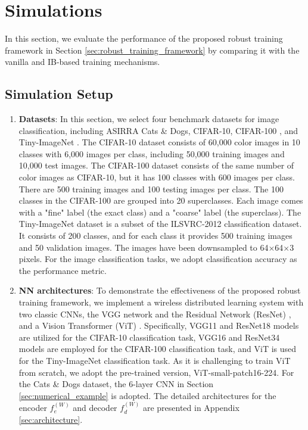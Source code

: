 \documentclass[lettersize,journal]{IEEEtran}
\theoremstyle{definition}
\theoremstyle{plain}
\begin{document}
\section{Simulations}
\label{sec:simulation}
In this section, we evaluate the performance of the proposed robust training framework in Section \ref{sec:robust_training_framework} by comparing it with the vanilla and IB-based training mechanisms.

\subsection{Simulation Setup}
\begin{enumerate}
    \item \textbf{Datasets}: In this section, we select four benchmark datasets for image classification, including ASIRRA Cats \& Dogs, CIFAR-10, CIFAR-100 \cite{CIFAR}, and Tiny-ImageNet \cite{tinyimagenet}. The CIFAR-10 dataset consists of 60,000 color images in 10 classes with 6,000 images per class, including 50,000 training images and 10,000 test images. The CIFAR-100 dataset consists of the same number of color images as CIFAR-10, but it has 100 classes with 600 images per class. There are 500 training images and 100 testing images per class. The 100 classes in the CIFAR-100 are grouped into 20 superclasses. Each image comes with a "fine" label (the exact class) and a "coarse" label (the superclass). 
    The Tiny-ImageNet dataset is a subset of the ILSVRC-2012 classification dataset. It consists of 200 classes, and for each class it provides 500 training images and 50 validation images. The images have been downsampled to 64$\times$64$\times$3 pixels. For the image classification tasks, we adopt classification accuracy as the performance metric. 
    \item \textbf{NN architectures}: To demonstrate the effectiveness of the proposed robust training framework, we implement a wireless distributed learning system with two classic CNNs, the VGG network \cite{VGG} and the Residual Network (ResNet) \cite{ResNet}, and a Vision Transformer (ViT) \cite{vit}. Specifically, VGG11 and ResNet18 models are utilized for the CIFAR-10 classification task, VGG16 and ResNet34 models are employed for the CIFAR-100 classification task, and ViT is used for the Tiny-ImageNet classification task. As it is challenging to train ViT from scratch, we adopt the pre-trained version, ViT-small-patch16-224. 
    For the Cats \& Dogs dataset, the 6-layer CNN in Section \ref{sec:numerical_example} is adopted. The detailed architectures for the encoder $f_e^{(W)}$ and decoder $f_d^{(W)}$ are presented in Appendix \ref{sec:architecture}.

\end{enumerate}
\end{document}
